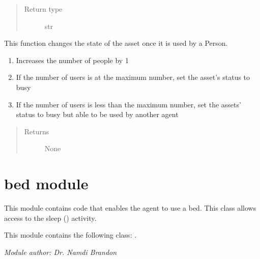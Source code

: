 \documentclass[letterpaper,10pt,english]{sphinxmanual}
\begin{document}
\begin{fulllineitems}
\begin{fulllineitems}
\begin{quote}
\begin{description}
\item[{Return type}] \leavevmode
str

\end{description}\end{quote}

\end{fulllineitems}


\begin{fulllineitems}
\label{asset:asset.Asset.update}
This function changes the state of the asset once it is used by a Person.
\begin{enumerate}
\item {} 
Increases the number of people by 1

\item {} 
If the number of users is at the maximum number, set the asset's status to busy

\item {} 
If the number of users is less than the maximum number, set the assets' status to busy but         able to be used by another agent

\end{enumerate}
\begin{quote}\begin{description}
\item[{Returns}] \leavevmode
None

\end{description}\end{quote}

\end{fulllineitems}


\end{fulllineitems}



\section{bed module}
\label{bed::doc}\label{bed:bed-module}\label{bed:module-bed}
This module contains code that enables the agent to use a bed. This class allows access to the sleep ({\hyperref[sleep:sleep.Sleep]{\emph{}}}) activity.

This module contains the following class: {\hyperref[bed:bed.Bed]{\emph{}}}.

\emph{Module author: Dr. Namdi Brandon}
\end{document}
